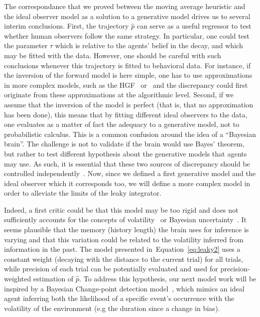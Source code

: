 \documentclass[profile,final,english,draft]{article}%
\newcommand{\citep}[1]{\parencite{#1}}
\newcommand{\seeEq}[1]{Equation~\ref{eq:#1}}
\begin{document}
The correspondance that we proved between the moving average heuristic
and the ideal observer model as a solution to a generative model drives
us to several interim conclusions.
First, the trajectory $\hat{p}$ can serve as a useful regressor
to test whether human observers follow the same strategy.
In particular, one could test the parameter $\tau$
which is relative to the agents' belief in the decay,
and which may be fitted with the data.
However, one should be careful with such conclusions whenever
this trajectory is fitted to behavioral data.
For instance, if the inversion of the forward model is here simple,
one has to use approximations in more complex models,
such as the HGF~\citep{Matthys2011} or~\citep{Wilson2013}
and the discrepancy could first originate from these approximations
at the algorithmic level.
Second, if we assume that the inversion of the model is perfect
(that is, that no approximation has been done),
this means that by fitting different ideal observers
to the data, one evaluates as a matter of fact the adequacy to
a generative model, not to probabilistic calculus.
This is a common confusion around the idea of a ``Bayesian brain''.
The challenge is not to validate if the brain would use Bayes' theorem,
but rather to test different hypothesis about the generative models
that agents may use. 
As such, it is essential that these two sources of discrepancy
should be controlled independently~\citep{beck and pouget}.
Now, since we defined a first generative model
and the ideal observer which it corresponds too,
we will define a more complex model
in order to alleviate the limits of the leaky integrator.

Indeed, a first critic could be that
this model may be too rigid and does not sufficiently
accounts for the concepts of volatility~\citep{Behrens2007}
or Bayesian uncertainty~\citep{Vilares2011}.
It seems plausible that the memory (history length) the brain uses
for inference is varying and that this variation could be related
to the volatility inferred from information in the past.
The model presented in~\seeEq{leaky2} uses a constant weight
(decaying with the distance to the current trial)
for all trials, while precision of each trial
can be potentially evaluated and used
for precision-weighted estimation of $\hat{p}$.
To address this hypothesis, our next model work will be inspired
by a Bayesian Change-point detection model~\citep{AdamsMackay2007},
which mimics an ideal agent inferring
both the likelihood of a specific event's occurrence
with the volatility of the environment
(e.g the duration since a change in bias).
\end{document}
